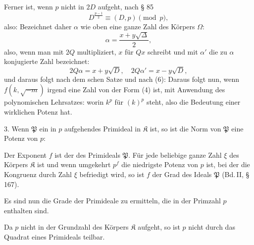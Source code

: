 
Ferner ist, wenn $p$ nicht in $2D$ aufgeht, nach § 85
\[
D^{\frac{p-1}{2}} \equiv (D, p) \pmod{p},
\]
also:
Bezeichnet daher $\alpha$ wie oben eine ganze Zahl des Körpers $\Omega$:
\[
\alpha = \frac{x + y\sqrt{\Delta}}{2},
\]
also, wenn man mit $2Q$ multipliziert, $x$ für $Qx$ schreibt und mit $\alpha'$ die zu $\alpha$ konjugierte Zahl bezeichnet:
\[
2Q\alpha = x + y\sqrt{D}, \quad 2Q\alpha' = x - y\sqrt{D},
\]
und daraus folgt nach dem schen Satze und nach (6):
Daraus folgt nun, wenn $f(k, \sqrt{-m})$ irgend eine Zahl von der Form (4) ist, mit Anwendung des polynomischen Lehrsatzes:
worin $k^p$ für $(k)^p$ steht, also die Bedeutung einer wirklichen Potenz hat.

3. Wenn $\mathfrak{P}$ ein in $p$ aufgehendes Primideal in $\mathfrak{K}$ ist, so ist die Norm von $\mathfrak{P}$ eine Potenz von $p$:

Der Exponent $f$ ist der  des Primideals $\mathfrak{P}$. Für jede beliebige ganze Zahl $\xi$ des Körpers $\mathfrak{K}$ ist
und wenn umgekehrt $p^f$ die niedrigste Potenz von $p$ ist, bei der die Kongruenz
durch  Zahl $\xi$ befriedigt wird, so ist $f$ der Grad des Ideals $\mathfrak{P}$ (Bd.\,II, § 167).

Es sind nun die Grade der Primideale zu ermitteln, die in der Primzahl $p$ enthalten sind.

Da $p$ nicht in der Grundzahl des Körpers $\mathfrak{K}$ aufgeht, so ist $p$ nicht durch das Quadrat eines Primideals teilbar.
